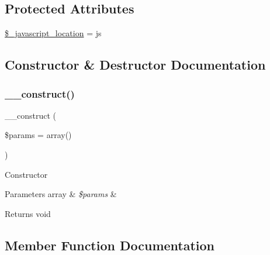 \subsection*{Protected Attributes}
\begin{DoxyCompactItemize}
\item 
\mbox{\hyperlink{class_c_i___javascript_a1ade0f4214435ac22074136db49cc257}{\$\+\_\+javascript\+\_\+location}} = \textquotesingle{}js\textquotesingle{}
\end{DoxyCompactItemize}


\subsection{Constructor \& Destructor Documentation}
\mbox{\label{class_c_i___javascript_a568ecdb0d73d2a870f33189739922a50}} 
\subsubsection{\texorpdfstring{\+\_\+\+\_\+construct()}{\_\_construct()}}
{\footnotesize\ttfamily \+\_\+\+\_\+construct (\begin{DoxyParamCaption}\item[{}]{\$params = {\ttfamily array()} }\end{DoxyParamCaption})}

Constructor


\begin{DoxyParams}[1]{Parameters}
array & {\em \$params} & \\
\hline
\end{DoxyParams}
\begin{DoxyReturn}{Returns}
void 
\end{DoxyReturn}


\subsection{Member Function Documentation}
\mbox{\label{class_c_i___javascript_a6646f735ee21ffe05997b5571f1be45c}} 
